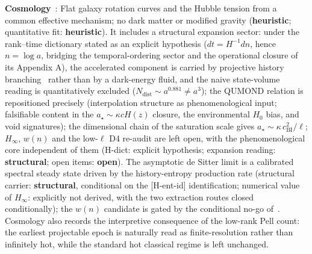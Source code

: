 \documentclass[11pt,a4paper]{article}
\newcommand{\sstruct}{\textcolor{cstruct}{\textbf{structural}}}
\newcommand{\sheur}{\textcolor{cheur}{\textbf{heuristic}}}
\newcommand{\sopen}{\textcolor{copen}{\textbf{open}}}
\begin{document}
    \textbf{Cosmology}~\cite{Beau2026d}: Flat galaxy rotation curves and the Hubble tension from a
    common effective mechanism; no dark matter or modified gravity (\sheur; quantitative fit: \sheur).
    It includes a structural expansion sector: under the rank--time dictionary stated as an explicit
    hypothesis ($dt = H^{-1}dn$, hence $n = \log a$, bridging the temporal-ordering sector and the operational
    closure of its Appendix A), the accelerated component is carried by projective history
    branching~\cite{Beau2026tb} rather than by a dark-energy fluid, and the naive state-volume reading is
    quantitatively excluded ($N_{\mathrm{dist}} \sim a^{0.881} \neq a^3$); the QUMOND relation is repositioned
    precisely (interpolation structure as phenomenological input; falsifiable content in the
    $a_\star \sim \kappa c H(z)$ closure, the environmental $H_0$ bias, and void signatures); the dimensional
    chain of the saturation scale gives $a_\star \sim \kappa\,c_{\mathrm{BI}}^2/\ell$; $H_\infty$, $w(n)$ and
    the low-$\ell$ D4 re-audit are left open, with the phenomenological core independent of them
    (H-dict: explicit hypothesis; expansion reading: \sstruct; open items: \sopen).
    The asymptotic de Sitter limit is a calibrated spectral
    steady state driven by the history-entropy production rate (structural carrier: \sstruct, conditional on
    the [H-ent-id] identification; numerical value of $H_\infty$: explicitly not derived, with the two
    extraction routes closed conditionally); the $w(n)$ candidate is gated by the conditional no-go
    of~\cite{Beau2026tb}.
    Cosmology also records the interpretive consequence of the low-rank Pell count: the earliest
    projectable epoch is naturally read as finite-resolution rather than infinitely hot, while the standard
    hot classical regime is left unchanged.
\end{document}
